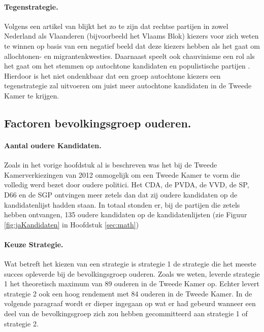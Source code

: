 \paragraph{Tegenstrategie.}
Volgens een artikel van \cite{de2000political} blijkt het zo te zijn dat rechtse partijen in zowel Nederland als Vlaanderen (bijvoorbeeld het Vlaams Blok) kiezers voor zich weten te winnen op basis van een negatief beeld dat deze kiezers hebben als het gaat om allochtonen- en migrantenkwesties. Daarnaast speelt ook chauvinisme een rol als het gaat om het stemmen op autochtone kandidaten en populistische partijen \citep{van2010swaying}. Hierdoor is het niet ondenkbaar dat een groep autochtone kiezers een tegenstrategie zal uitvoeren om juist meer autochtone kandidaten in de Tweede Kamer te krijgen.

\subsection{Factoren bevolkingsgroep ouderen.}
\label{percO}

\paragraph{Aantal oudere Kandidaten.} 
Zoals in het vorige hoofdstuk al is beschreven was het bij de Tweede Kamerverkiezingen van 2012 onmogelijk om een Tweede Kamer te vorm die volledig werd bezet door oudere politici. Het CDA, de PVDA, de VVD, de SP, D66 en de SGP ontvingen meer zetels dan dat zij oudere kandidaten op de kandidatenlijst hadden staan. In totaal stonden er, bij de partijen die zetels hebben ontvangen, 135 oudere kandidaten op de kandidatenlijsten (zie Figuur \ref{fig:jaKandidaten} in Hoofdstuk \ref{sec:math})

\paragraph{Keuze Strategie.}
Wat betreft het kiezen van een strategie is strategie 1 de strategie die het meeste succes opleverde bij de bevolkingsgroep ouderen. Zoals we weten, leverde strategie 1 het theoretisch maximum van 89 ouderen in de Tweede Kamer op. Echter levert strategie 2 ook een hoog rendement met 84 ouderen in de Tweede Kamer. In de volgende paragraaf wordt er dieper ingegaan op wat er had gebeurd wanneer een deel van de bevolkingsgroep zich zou hebben gecommitteerd aan strategie 1 of strategie 2.


